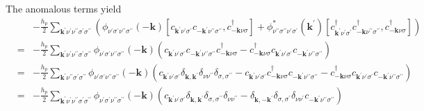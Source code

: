 The anomalous terms yield
\begin{eqnarray}
& & -\frac{h_p}{2}
\sum_{\mathbf{k}^{\prime}\nu^{\prime}\nu^{\prime\prime}\sigma^{\prime}\sigma^{\prime\prime}}
\left(\phi_{\nu^{\prime}\sigma^{\prime}\nu^{\prime\prime}\sigma^{\prime\prime}}(-\mathbf{k})
\left[ c_{\mathbf{k}^{\prime}\nu^{\prime}\sigma^{\prime}}
c_{-\mathbf{k}^{\prime}\nu^{\prime\prime}\sigma^{\prime\prime}},
c^{\dagger}_{-\mathbf{k}\nu\sigma}\right]
+ \phi^*_{\nu^{\prime\prime}\sigma^{\prime\prime}\nu^{\prime}\sigma^{\prime}}(\mathbf{k}^{\prime})
\left[ c^{\dagger}_{\mathbf{k}^{\prime}\nu^{\prime}\sigma^{\prime}}
c^{\dagger}_{-\mathbf{k}\nu^{\prime\prime}\sigma^{\prime\prime}},
c^{\dagger}_{-\mathbf{k}\nu\sigma} \right] \right) \\
& = & -\frac{h_p}{2}
\sum_{\mathbf{k}^{\prime}\nu^{\prime}\nu^{\prime\prime}\sigma^{\prime}\sigma^{\prime\prime}}
\phi_{\nu^{\prime}\sigma^{\prime}\nu^{\prime\prime}\sigma^{\prime\prime}}(-\mathbf{k})
\left(c_{\mathbf{k}^{\prime}\nu^{\prime}\sigma^{\prime}}
c_{-\mathbf{k}^{\prime}\nu^{\prime\prime}\sigma^{\prime\prime}}
c^{\dagger}_{-\mathbf{k}\nu\sigma} -
c^{\dagger}_{-\mathbf{k}\nu\sigma}
c_{\mathbf{k}^{\prime}\nu^{\prime}\sigma^{\prime}}
c_{-\mathbf{k}^{\prime}\nu^{\prime\prime}\sigma^{\prime\prime}} \right)\\
& = & -\frac{h_p}{2}
\sum_{\mathbf{k}^{\prime}\nu^{\prime\prime}\sigma^{\prime}\sigma^{\prime\prime}}
\phi_{\nu^{\prime}\sigma^{\prime}\nu^{\prime\prime}\sigma^{\prime\prime}}(-\mathbf{k})
\left(c_{\mathbf{k}^{\prime}\nu^{\prime}\sigma^{\prime}} 
\delta_{\mathbf{k},\mathbf{k}^{\prime}}\delta_{\nu\nu^{\prime\prime}}
\delta_{\sigma,\sigma^{\prime\prime}}
-
c_{\mathbf{k}^{\prime}\nu^{\prime}\sigma^{\prime}}
c^{\dagger}_{-\mathbf{k}\nu\sigma}
c_{-\mathbf{k}^{\prime}\nu^{\prime\prime}\sigma^{\prime\prime}}
-
c^{\dagger}_{-\mathbf{k}\nu\sigma}
c_{\mathbf{k}^{\prime}\nu^{\prime}\sigma^{\prime}}
c_{-\mathbf{k}^{\prime}\nu^{\prime\prime}\sigma^{\prime\prime}} \right) \\
& = & -\frac{h_p}{2}
\sum_{\mathbf{k}^{\prime}\nu^{\prime}\nu^{\prime\prime}\sigma^{\prime}\sigma^{\prime\prime}}
\phi_{\nu^{\prime}\sigma^{\prime}\nu^{\prime\prime}\sigma^{\prime\prime}}(-\mathbf{k})
\left(c_{\mathbf{k}^{\prime}\nu^{\prime}\sigma^{\prime}} 
\delta_{\mathbf{k},\mathbf{k}^{\prime}}
\delta_{\sigma,\sigma^{\prime\prime}}\delta_{\nu\nu^{\prime\prime}}
- \delta_{\mathbf{k},-\mathbf{k}^{\prime}}
\delta_{\sigma,\sigma^{\prime}}\delta_{\nu\nu^{\prime}} 
c_{-\mathbf{k}^{\prime}\nu^{\prime\prime}\sigma^{\prime\prime}} \right) \\

\end{eqnarray}
